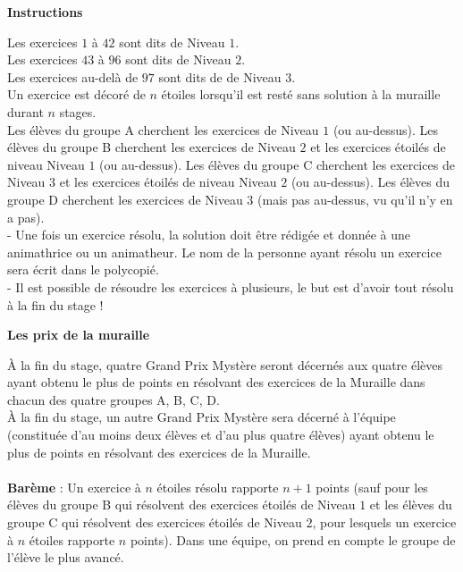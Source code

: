 \begin{center}
\small{\textbf{Instructions}}
\end{center}
\begin{small}
Les exercices $1$ à $42$ sont dits de Niveau $1$.\\
Les exercices $43$ à $96$ sont dits de Niveau $2$.\\
Les exercices au-delà de $97$ sont dits de de Niveau $3$.\\
Un exercice est décoré de $n$ étoiles lorsqu’il est resté sans solution à la muraille durant $n$ stages.\\
Les élèves du groupe A cherchent les exercices de Niveau $1$ (ou au-dessus). Les élèves du groupe B cherchent les exercices de Niveau $2$ et les exercices étoilés de niveau Niveau $1$ (ou au-dessus). Les élèves du groupe C cherchent les exercices de Niveau $3$ et les exercices étoilés de niveau Niveau $2$ (ou au-dessus). Les élèves du groupe D cherchent les exercices de Niveau $3$ (mais pas au-dessus, vu qu’il n’y en a pas).\\
- Une fois un exercice résolu, la solution doit être rédigée et donnée à une animathrice ou un animatheur. Le nom de la personne ayant résolu un exercice sera écrit dans le polycopié.\\
- Il est possible de résoudre les exercices à plusieurs, le but est d’avoir tout résolu à la fin du stage !
\end{small}
\begin{center}
\Large{\textbf{Les prix de la muraille}}
\end{center}
À la fin du stage, quatre Grand Prix Mystère seront décernés aux quatre élèves ayant obtenu le plus de points en résolvant des exercices de la Muraille dans chacun des quatre groupes A, B, C, D.\\
À la fin du stage, un autre Grand Prix Mystère sera décerné à l’équipe (constituée d’au moins deux élèves et d’au plus quatre élèves) ayant obtenu le plus de points en résolvant des exercices de la Muraille.\\~~\\
\textbf{Barème} : Un exercice à $n$ étoiles résolu rapporte $n + 1$ points (sauf pour les élèves du groupe B qui résolvent des exercices étoilés de Niveau $1$ et les élèves du groupe C qui résolvent des exercices étoilés de Niveau $2$, pour lesquels un exercice à $n$ étoiles rapporte $n$ points). Dans une équipe, on prend en compte le groupe de l’élève le plus avancé.